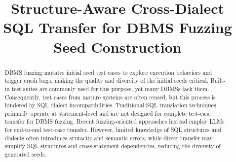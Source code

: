 \documentclass[conference]{IEEEtran}
\begin{document}
\title{Structure-Aware Cross-Dialect SQL Transfer for DBMS Fuzzing Seed Construction}


\maketitle

\begin{abstract}

DBMS fuzzing mutates initial seed test cases to explore execution behaviors and trigger crash bugs, making the quality and diversity of the initial seeds critical.
Built-in test suites are commonly used for this purpose, yet many DBMSs lack them.
Consequently, test cases from mature systems are often reused, but this process is hindered by SQL dialect incompatibilities.
Traditional SQL translation techniques primarily operate at statement-level and are not designed for complete test-case transfer for DBMS fuzzing.
Recent fuzzing-oriented approaches instead employ LLMs for end-to-end test-case transfer.
However, limited knowledge of SQL structures and dialects often introduces syntactic and semantic errors, while direct transfer may simplify SQL structures and cross-statement dependencies, reducing the diversity of generated seeds.


\end{abstract}
\end{document}
